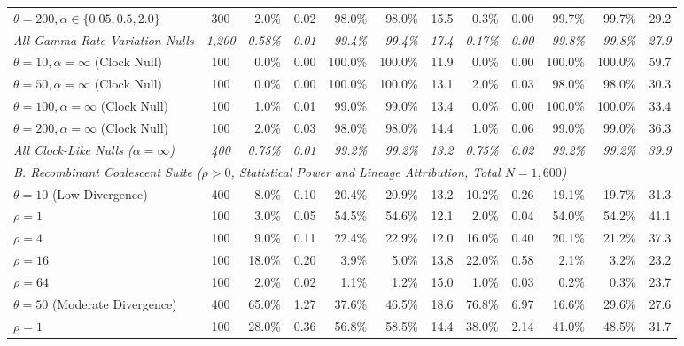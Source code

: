 \begin{table}[!ht]
{\begin{tabular}{@{}l c rrrrr rrrrr@{}}
$\theta = 200, \alpha \in \{0.05, 0.5, 2.0\}$ & 300 & 2.0\% & 0.02 & 98.0\% & 98.0\% & 15.5 & 0.3\% & 0.00 & 99.7\% & 99.7\% & 29.2 \\
\textit{All Gamma Rate-Variation Nulls} & \textit{1,200} & \textit{0.58\%} & \textit{0.01} & \textit{99.4\%} & \textit{99.4\%} & \textit{17.4} & \textit{0.17\%} & \textit{0.00} & \textit{99.8\%} & \textit{99.8\%} & \textit{27.9} \\
$\theta = 10, \alpha = \infty$ (Clock Null) & 100 & 0.0\% & 0.00 & 100.0\% & 100.0\% & 11.9 & 0.0\% & 0.00 & 100.0\% & 100.0\% & 59.7 \\
$\theta = 50, \alpha = \infty$ (Clock Null) & 100 & 0.0\% & 0.00 & 100.0\% & 100.0\% & 13.1 & 2.0\% & 0.03 & 98.0\% & 98.0\% & 30.3 \\
$\theta = 100, \alpha = \infty$ (Clock Null) & 100 & 1.0\% & 0.01 & 99.0\% & 99.0\% & 13.4 & 0.0\% & 0.00 & 100.0\% & 100.0\% & 33.4 \\
$\theta = 200, \alpha = \infty$ (Clock Null) & 100 & 2.0\% & 0.03 & 98.0\% & 98.0\% & 14.4 & 1.0\% & 0.06 & 99.0\% & 99.0\% & 36.3 \\
\textit{All Clock-Like Nulls ($\alpha = \infty$)} & \textit{400} & \textit{0.75\%} & \textit{0.01} & \textit{99.2\%} & \textit{99.2\%} & \textit{13.2} & \textit{0.75\%} & \textit{0.02} & \textit{99.2\%} & \textit{99.2\%} & \textit{39.9} \\
\midrule
\multicolumn{12}{l}{\textit{B. Recombinant Coalescent Suite ($\rho > 0$, Statistical Power and Lineage Attribution, Total $N = 1{,}600$)}} \\
$\theta = 10$ (Low Divergence) & 400 & 8.0\% & 0.10 & 20.4\% & 20.9\% & 13.2 & 10.2\% & 0.26 & 19.1\% & 19.7\% & 31.3 \\
\quad $\rho = 1$ & 100 & 3.0\% & 0.05 & 54.5\% & 54.6\% & 12.1 & 2.0\% & 0.04 & 54.0\% & 54.2\% & 41.1 \\
\quad $\rho = 4$ & 100 & 9.0\% & 0.11 & 22.4\% & 22.9\% & 12.0 & 16.0\% & 0.40 & 20.1\% & 21.2\% & 37.3 \\
\quad $\rho = 16$ & 100 & 18.0\% & 0.20 & 3.9\% & 5.0\% & 13.8 & 22.0\% & 0.58 & 2.1\% & 3.2\% & 23.2 \\
\quad $\rho = 64$ & 100 & 2.0\% & 0.02 & 1.1\% & 1.2\% & 15.0 & 1.0\% & 0.03 & 0.2\% & 0.3\% & 23.7 \\
$\theta = 50$ (Moderate Divergence) & 400 & 65.0\% & 1.27 & 37.6\% & 46.5\% & 18.6 & 76.8\% & 6.97 & 16.6\% & 29.6\% & 27.6 \\
\quad $\rho = 1$ & 100 & 28.0\% & 0.36 & 56.8\% & 58.5\% & 14.4 & 38.0\% & 2.14 & 41.0\% & 48.5\% & 31.7 \\

\end{tabular}}
\end{table}
